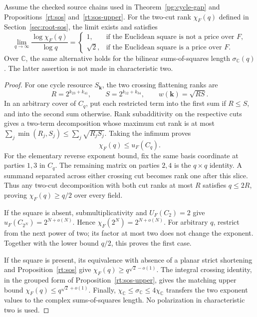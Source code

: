 \begin{corollary}
\label{pg:crossing-exponent-gap}
Assume the checked source chains used in
Theorem~\ref{pg:cycle-gap} and Propositions~\ref{rt:sos}
and~\ref{rt:sos-upper}. For the two-cut rank $\chi_F(q)$ defined
in Section~\ref{sec:root-sos}, the limit exists and satisfies
\[
 \lim_{q\to\infty}\frac{\log\chi_F(q)}{\log q}
 =
 \begin{cases}
 1,&\text{if the Euclidean square is not a price over }F,\\
 \sqrt2,&\text{if the Euclidean square is a price over }F.
 \end{cases}
 \tag{PG-CROSSING-exponent}
\]
Over $\mathbb C$, the same alternative holds for the bilinear
sums-of-squares length $\sigma_{\mathbb C}(q)$. The latter
assertion is not made in characteristic two.
\end{corollary}
\begin{proof}
For one cycle resource $S_{\mathbf k}$, the two crossing
flattening ranks are
\[
 R=2^{k_{23}+k_{41}},\qquad
 S=2^{k_{12}+k_{34}},\qquad w(\mathbf k)=\sqrt{RS}.
\]
In an arbitrary cover of $C_q$, put each restricted term into
the first sum if $R\leq S$, and into the second sum otherwise.
Rank subadditivity on the respective cuts gives a two-term
decomposition whose maximum cut rank is at most
$\sum_j\min(R_j,S_j)\leq\sum_j\sqrt{R_jS_j}$.
Taking the infimum proves
\[
 \chi_F(q)\leq u_F(C_q).
\]
For the elementary reverse exponent bound, fix the same basis
coordinate at parties $1,3$ in $C_q$. The remaining matrix on
parties $2,4$ is the $q\times q$ identity. A summand separated
across either crossing cut becomes rank one after this slice.
Thus any two-cut decomposition with both cut ranks at most $R$
satisfies $q\leq2R$, proving $\chi_F(q)\geq q/2$ over every field.

If the square is absent, submultiplicativity and
$U_F(C_2)=2$ give
$u_F(C_{2^N})=2^{N+o(N)}$. Hence
$\chi_F(2^N)=2^{N+o(N)}$.
For arbitrary $q$, restrict from the next power of two; its
factor at most two does not change the exponent. Together with
the lower bound $q/2$, this proves the first case.

If the square is present, its equivalence with absence of a
planar strict shortening and Proposition~\ref{rt:sos} give
$\chi_F(q)\geq q^{\sqrt2-o(1)}$.
The integral crossing identity, in the grouped form of
Proposition~\ref{rt:sos-upper}, gives the matching upper bound
$\chi_F(q)\leq q^{\sqrt2+o(1)}$. Finally,
$\chi_{\mathbb C}\leq\sigma_{\mathbb C}\leq4\chi_{\mathbb C}$
transfers the two exponent values to the complex sums-of-squares
length. No polarization in characteristic two is used.
\end{proof}

